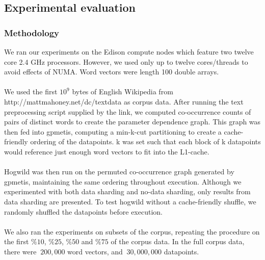 \documentclass[times,11pt]{article}
\numberwithin{equation}{section}		%
\numberwithin{figure}{section}			%
\numberwithin{table}{section}				%
\begin{document}
\subsection{Experimental evaluation}
\subsubsection{Methodology}

We ran our experiments on the Edison compute nodes which feature two
twelve core 2.4 GHz processors. However, we used only up to twelve
cores/threads to avoid effects of NUMA. Word vectors were length 100
double arrays.
\\\\
We used the first $10^9$ bytes of English Wikipedia from
http://mattmahoney.net/dc/textdata as corpus data. After running the text
preprocessing script supplied by the link, we computed co-occurrence
counts of pairs of distinct words to create the parameter dependence graph.
This graph was then fed into gpmetis, computing a min-k-cut partitioning to
create a cache-friendly ordering of the datapoints. k was set such that each
block of k datapoints would reference just enough word vectors to fit into the
L1-cache.
\\\\
Hogwild was then run on the permuted co-occurrence graph generated by gpmetis,
maintaining the same ordering throughout execution. Although we experimented with
both data sharding and no-data sharding, only results from data sharding are presented.
To test hogwild without a cache-friendly shuffle, we randomly shuffled the datapoints before execution.
\\\\
We also ran the experiments on subsets of the corpus, repeating the
procedure on the first $\%10$, $\%25$, $\%50$ and $\%75$ of the corpus data.
In the full corpus data, there were $~200,000$ word vectors, and $~30,000,000$
datapoints.
\end{document}
